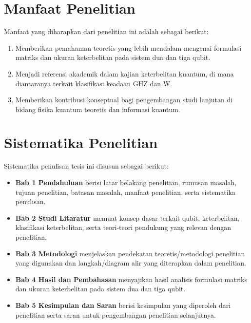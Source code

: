 \section{Manfaat Penelitian}
Manfaat yang diharapkan dari penelitian ini adalah sebagai berikut:
\begin{enumerate}
    \item Memberikan pemahaman teoretis yang lebih mendalam mengenai formulasi matriks dan ukuran keterbelitan pada sistem dua dan tiga qubit.
    \item Menjadi referensi akademik dalam kajian keterbelitan kuantum, di mana diantaranya terkait klasifikasi keadaan GHZ dan W.
    \item Memberikan kontribusi konseptual bagi pengembangan studi lanjutan di bidang fisika kuantum teoretis dan informasi kuantum.
\end{enumerate}

\section{Sistematika Penelitian}
Sistematika penulisan tesis ini disusun sebagai berikut:
\begin{itemize}
    \item \textbf{Bab 1 Pendahuluan} berisi latar belakang penelitian, rumusan masalah, tujuan penelitian, batasan masalah, manfaat penelitian, serta sistematika penulisan.
    \item \textbf{Bab 2 Studi Litaratur} memuat konsep dasar terkait qubit, keterbelitan, klasifikasi keterbelitan, serta teori-teori pendukung yang relevan dengan penelitian.
    \item \textbf{Bab 3 Metodologi} menjelaskan pendekatan teoretis/metodologi penelitian yang digunakan dan langkah/diagram alir yang diterapkan dalam penelitian.
    \item \textbf{Bab 4 Hasil dan Pembahasan} menyajikan hasil analisis formulasi matriks dan ukuran keterbelitan pada sistem dua dan tiga qubit.
    \item \textbf{Bab 5 Kesimpulan dan Saran} berisi kesimpulan yang diperoleh dari penelitian serta saran untuk pengembangan penelitian selanjutnya.
\end{itemize}


